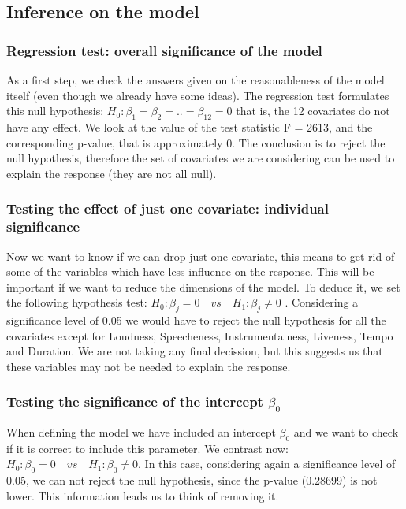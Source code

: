 \documentclass[11pt]{article}\usepackage[]{graphicx}\usepackage[]{xcolor}
\begin{document}
\subsection{Inference on the model}
\subsubsection{Regression test: overall significance of the model}
As a first step, we check the answers given on the reasonableness of the model itself (even though we already have some ideas). The regression test formulates this null hypothesis: 
$ H_0 : \beta_1 = \beta_2 = .. = \beta_{12} = 0 $
that is, the 12 covariates do not have any effect. We look at the value of the test statistic F = 2613, and the corresponding p-value, that is approximately 0. The conclusion is to reject the null hypothesis, therefore the set of covariates we are considering can be used to explain the response (they are not all null).

\subsubsection{Testing the effect of just one covariate: individual significance}
Now we want to know if we can drop just one covariate, this means to get rid of some of the variables which have less influence on the response. This will be important if we want to reduce the dimensions of the model. To deduce it, we set the following hypothesis test: 
$ H_0 : \beta_j = 0 \quad  vs \quad  H_1 : \beta_j \neq 0 $ .
Considering a significance level of 0.05 we would have to reject the null hypothesis for all the covariates except for Loudness,  Speecheness, Instrumentalness, Liveness, Tempo and Duration. We are not taking any final decission, but this suggests us that these variables may not be needed to explain the response.

\subsubsection{Testing the significance of the intercept $\beta_0$}
When defining the model we have included an intercept $\beta_0$ and we want to check if it is correct to include this parameter. We contrast now: $ H_0 : \beta_0 = 0 \quad vs \quad H_1 :  \beta_0 \neq 0 $.
In this case, considering again a significance level of 0.05, we can not reject the null hypothesis, since the p-value (0.28699) is not lower. This information leads us to think of removing it.
\end{document}
